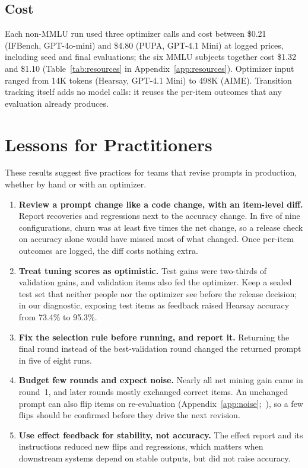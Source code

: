 \documentclass[11pt]{article}
\begin{document}
\subsection{Cost}
\label{sec:resources}

Each non-MMLU run used three optimizer calls and cost between \$0.21 (IFBench, GPT-4o-mini) and \$4.80 (PUPA, GPT-4.1 Mini) at logged prices, including seed and final evaluations; the six MMLU subjects together cost \$1.32 and \$1.10 (Table~\ref{tab:resources} in Appendix~\ref{app:resources}). Optimizer input ranged from 14K tokens (Hearsay, GPT-4.1 Mini) to 498K (AIME). Transition tracking itself adds no model calls: it reuses the per-item outcomes that any evaluation already produces.

\section{Lessons for Practitioners}
\label{sec:lessons}
\label{sec:discussion}

These results suggest five practices for teams that revise prompts in production, whether by hand or with an optimizer.

\begin{enumerate}
\setlength{\itemsep}{1pt}
\setlength{\parskip}{0pt}
\setlength{\topsep}{1pt}
\item \textbf{Review a prompt change like a code change, with an item-level diff.} Report recoveries and regressions next to the accuracy change. In five of nine configurations, churn was at least five times the net change, so a release check on accuracy alone would have missed most of what changed. Once per-item outcomes are logged, the diff costs nothing extra.
\item \textbf{Treat tuning scores as optimistic.} Test gains were two-thirds of validation gains, and validation items also fed the optimizer. Keep a sealed test set that neither people nor the optimizer see before the release decision; in our diagnostic, exposing test items as feedback raised Hearsay accuracy from 73.4\% to 95.3\%.
\item \textbf{Fix the selection rule before running, and report it.} Returning the final round instead of the best-validation round changed the returned prompt in five of eight runs.
\item \textbf{Budget few rounds and expect noise.} Nearly all net mining gain came in round~1, and later rounds mostly exchanged correct items. An unchanged prompt can also flip items on re-evaluation (Appendix~\ref{app:noise};~\citealp{atil2025nondeterminism}), so a few flips should be confirmed before they drive the next revision.
\item \textbf{Use effect feedback for stability, not accuracy.} The effect report and its instructions reduced new flips and regressions, which matters when downstream systems depend on stable outputs, but did not raise accuracy.
\end{enumerate}
\end{document}
